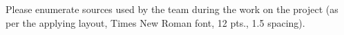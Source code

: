 Please enumerate sources used by the team during the work on the project (as per the applying layout, Times New Roman font, 12 pts., 1.5 spacing).